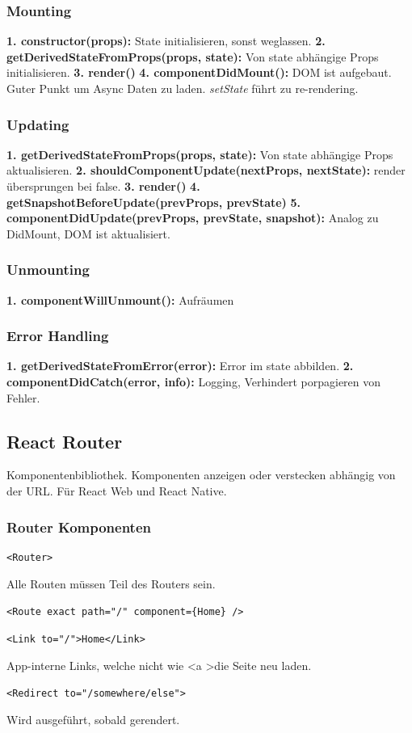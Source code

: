 \subsubsection{Mounting}
\textbf{1. constructor(props):} State initialisieren, sonst weglassen.
\textbf{2. getDerivedStateFromProps(props, state):} Von state abhängige Props initialisieren.
\textbf{3. render()}
\textbf{4. componentDidMount():} DOM ist aufgebaut. Guter Punkt um Async Daten zu laden. \textit{setState} führt zu re-rendering.

\subsubsection{Updating}
\textbf{1. getDerivedStateFromProps(props, state):} Von state abhängige Props aktualisieren.
\textbf{2. shouldComponentUpdate(nextProps, nextState):} render übersprungen bei false.
\textbf{3. render()}
\textbf{4. getSnapshotBeforeUpdate(prevProps, prevState)}
\textbf{5. componentDidUpdate(prevProps, prevState, snapshot):} Analog zu DidMount, DOM ist aktualisiert.

\subsubsection{Unmounting}
\textbf{1. componentWillUnmount():} Aufräumen

\subsubsection{Error Handling}
\textbf{1. getDerivedStateFromError(error):} Error im state abbilden.
\textbf{2. componentDidCatch(error, info):} Logging, Verhindert porpagieren von Fehler.

\subsection{React Router}
Komponentenbibliothek.
Komponenten anzeigen oder verstecken abhängig von der URL.
Für React Web und React Native.

\subsubsection{Router Komponenten}
\begin{lstlisting}
<Router>
\end{lstlisting}
Alle Routen müssen Teil des Routers sein.
\begin{lstlisting}
<Route exact path="/" component={Home} />
\end{lstlisting}
\begin{lstlisting}
<Link to="/">Home</Link>
\end{lstlisting}
App-interne Links, welche nicht wie \textless a \textgreater die Seite neu laden.
\begin{lstlisting}
<Redirect to="/somewhere/else">
\end{lstlisting}
Wird ausgeführt, sobald gerendert.

